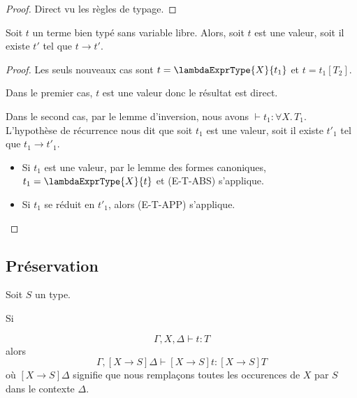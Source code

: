 \begin{proof}
  Direct vu les règles de typage.
\end{proof}

\begin{theorem} [de progression]
  Soit $t$ un terme bien typé sans variable libre. Alors, soit $t$ est une
  valeur, soit il existe $t'$ tel que $t \rightarrow t'$.
\end{theorem}

\begin{proof}
  Les seuls nouveaux cas sont $t = \lambdaExprType{X}{t_{1}}$ et $t =
  t_{1}[T_{2}]$.

  Dans le premier cas, $t$ est une valeur donc le résultat est direct.

  Dans le second cas, par le lemme d'inversion, nous avons $\vdash t_{1} :
  \forall X . \, T_{1}$. L'hypothèse de récurrence nous dit que soit $t_{1}$ est
  une valeur, soit il existe $t'_{1}$ tel que $t_{1} \rightarrow t'_{1}$.

  \begin{itemize}
  \item Si $t_{1}$ est une valeur, par le lemme des formes canoniques, $t_{1} =
    \lambdaExprType{X}{t}$ et (E-T-ABS) s'applique.
  \item Si $t_{1}$ se réduit en $t'_{1}$, alors (E-T-APP) s'applique.
  \end{itemize}
\end{proof}

\subsection*{Préservation}

%
%
%
%  

\begin{lemma} 
  \label{thm:system-f-preservation-substitution-type}
  Soit $S$ un type.

  Si

  \begin{equation*}
    \Gamma, X, \Delta \vdash t : T
  \end{equation*}
  alors
  \begin{equation*}
    \Gamma, [X \rightarrow S]\Delta \vdash [X \rightarrow S]t : [X \rightarrow S] T 
  \end{equation*}
  où $[X \rightarrow S]\Delta$ signifie que nous remplaçons toutes les
  occurences de $X$ par $S$ dans le contexte $\Delta$.
\end{lemma}

